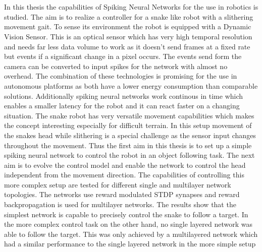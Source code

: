 \chapter{\abstractname}



In this thesis the capabilities of Spiking Neural Networks for the use in robotics is studied. The aim is to realize a controller for a snake like robot with a slithering movement gait. To sense its environment the robot is equipped with a Dynamic Vision Sensor. This is an optical sensor which has very high temporal resolution and needs far less data volume to work as it doesn't send frames at a fixed rate but events if a significant change in a pixel occurs. The events send form the camera can be converted to input spikes for the network with almost no overhead. The combination of these technologies is promising for the use in autonomous platforms as both have a lower energy consumption than comparable solutions. Additionally spiking neural networks work continous in time which enables a smaller latency for the robot and it can react faster on a changing situation. The snake robot has very versatile movement capabilities which makes the concept interesting especially for difficult terrain.
\newline
In this setup movement of the snakes head while slithering is a special challenge as the sensor input changes throughout the movement. Thus the first aim in this thesis is to set up a simple spiking neural network to control the robot in an object following task. The next aim is to evolve the control model and enable the network to control the head independent from the movement direction. The capabilities of controlling this more complex setup are tested for different single and multilayer network topologies. The networks use reward modulated STDP synapses and reward backpropagation is used for multilayer networks.
The results show that the simplest network is capable to precisely control the snake to follow a target. In the more complex control task on the other hand, no single layered network was able to follow the target. This was only achieved by a multilayered network which had a similar performance to the single layered network in the more simple setup





